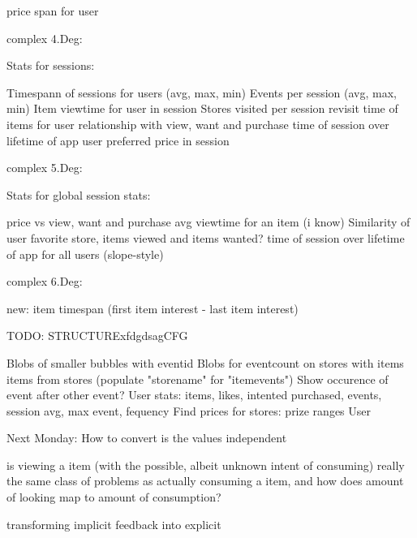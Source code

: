         price span for user

    complex 4.Deg:

        Stats for sessions:

            Timespann of sessions for users (avg, max, min)
            Events per session (avg, max, min)
            Item viewtime for user in session
            Stores visited per session
            revisit time of items for user
            relationship with view, want and purchase
            time of session over lifetime of app
            user preferred price in session

    complex 5.Deg:

        Stats for global session stats:

            price vs view, want and purchase
            avg viewtime for an item (i know)
            Similarity of user favorite store, items viewed and items wanted?
            time of session over lifetime of app for all users (slope-style)

    complex 6.Deg:

    new:
        item timespan (first item interest - last item interest)


TODO: STRUCTURExfdgdsagCFG

    Blobs of smaller bubbles with eventid
    Blobs for eventcount on stores with items items from stores (populate "storename" for "itemevents")
    Show occurence of event after other event?
    User stats: items, likes, intented purchased, events, session avg, max event, fequency
    Find prices for stores: prize ranges
    User

 Next Monday:
    How to convert
    is the values independent

is viewing a item (with the possible, albeit unknown intent of consuming) really the same class of problems as actually consuming a item, and how does amount of looking map to amount of consumption?

transforming implicit feedback into explicit
